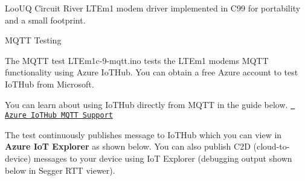 Loo\+UQ Circuit River L\+T\+Em1 modem driver implemented in C99 for portability and a small footprint.

 M\+Q\+TT Testing

The M\+Q\+TT test L\+T\+Em1c-\/9-\/mqtt.\+ino tests the L\+T\+Em1 modem\textquotesingle{}s M\+Q\+TT functionality using Azure Io\+T\+Hub. You can obtain a free Azure account to test Io\+T\+Hub from Microsoft.

You can learn about using Io\+T\+Hub directly from M\+Q\+TT in the guide below. \href{https://docs.microsoft.com/en-us/azure/iot-hub/iot-hub-mqtt-support}{\texttt{ Azure Io\+T\+Hub M\+Q\+TT Support}}

The test continuously publishes message to Io\+T\+Hub which you can view in {\bfseries{Azure IoT Explorer}} as shown below. You can also publish C2D (cloud-\/to-\/device) messages to your device using IoT Explorer (debugging output shown below in Segger R\+TT viewer).

 

  